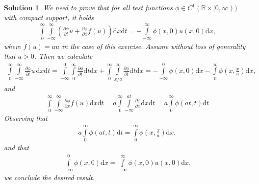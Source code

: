\documentclass[10pt,letterpaper]{article}
\theoremstyle{break}
\newtheorem{solution}{Solution}
\begin{document}
\begin{solution}
    We need to prove that for all test functions $\phi \in C^1(\mathbb{R} \times [0,\infty))$
    with compact support, it holds 
    \begin{align}
    	\int\limits_{0}^{\infty}
    	\int\limits_{-\infty}^{\infty}
    	\left(
    		\frac{\partial \phi}{\partial t}
    		u
    		+
    		\frac{\partial \phi}{\partial x}
    		f(u)
    	\right)
    	\text{d}x \text{d} t
    	=
    	-
    	\int\limits_{-\infty}^{\infty}
    	\phi(x,0) u(x,0)
    	\text{d}x,
    \end{align}
    where $f(u) = au$ in the case of this exercise.
    Assume without loss of generality that $a>0$.
    Then we calculate 
    \begin{align}
    	\int\limits_{0}^{\infty}
    	\int\limits_{-\infty}^{\infty}
    	\frac{\partial \phi}{\partial t}
    	u \,
    	\text{d}x \text{d} t
    	=
    	\int\limits_{-\infty}^{0}
    	\int\limits_{0}^{\infty}
    	\frac{\partial \phi}{\partial t}
    	\text{d}t \text{d} x
    	+
    	\int\limits_{0}^{\infty}
    	\int\limits_{x/a}^{\infty}
    	\frac{\partial \phi}{\partial t}
    	\text{d}t \text{d} x
    	=
    	-
    	\int\limits_{-\infty}^{0}
    	\phi(x,0)
    	\text{d} x
    	-
    	\int\limits_{0}^{\infty}
    	\phi
    	\left(x,\frac{x}{a}\right)
    	\text{d} x,
    \end{align}
    and
    \begin{align}
    	\int\limits_{0}^{\infty}
    	\int\limits_{-\infty}^{\infty}
    	\frac{\partial \phi}{\partial x}
    	f(u)
    	\text{d}x \text{d} t
    	=
    	a
    	\int\limits_{0}^{\infty}
    	\int\limits_{-\infty}^{at}
    	\frac{\partial \phi}{\partial x}
    	\text{d}x \text{d} t
    	=
    	a
    	\int\limits_{0}^{\infty}
    	\phi
    	\left(at,t\right)
    	\text{d}t
    \end{align}
    Observing that
    \begin{align}
    	a
    	\int\limits_{0}^{\infty}
    	\phi
    	\left(at,t\right)
    	\text{d}t
    	=
    	\int\limits_{0}^{\infty}
    	\phi
    	\left(x,\frac{x}{a}\right)
    	\text{d} x,
    \end{align}
    and that
    \begin{align}
    	\int\limits_{-\infty}^{0}
    	\phi(x,0)
    	\text{d} x
    	=
    	\int\limits_{-\infty}^{\infty}
    	\phi(x,0)
    	u(x,0)
    	\text{d} x,
    \end{align}
    we conclude the desired result.
\end{solution}
\end{document}

